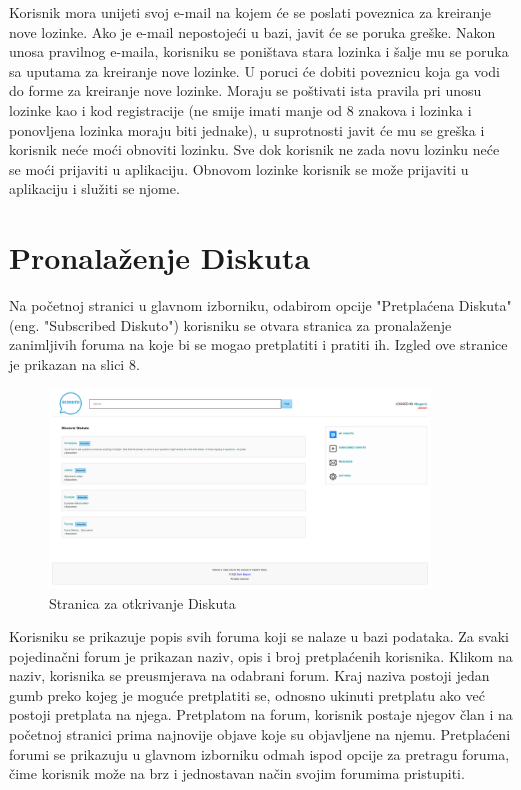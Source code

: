 \documentclass{foi}
\begin{document}
Korisnik mora unijeti svoj e-mail na kojem će se poslati poveznica za kreiranje nove lozinke. Ako je e-mail nepostojeći u bazi, javit će se poruka greške. Nakon unosa pravilnog e-maila, korisniku se poništava stara lozinka i šalje mu se poruka sa uputama za kreiranje nove lozinke. U poruci će dobiti poveznicu koja ga vodi do forme za kreiranje nove lozinke. Moraju se poštivati ista pravila pri unosu lozinke kao i kod registracije (ne smije imati manje od 8 znakova i lozinka i ponovljena lozinka moraju biti jednake), u suprotnosti javit će mu se greška i korisnik neće moći obnoviti lozinku. Sve dok korisnik ne zada novu lozinku neće se moći prijaviti u aplikaciju. Obnovom lozinke korisnik se može prijaviti u aplikaciju i služiti se njome.

\section{Pronalaženje Diskuta}

Na početnoj stranici u glavnom izborniku, odabirom opcije "Pretplaćena Diskuta" (eng. "Subscribed Diskuto") korisniku se otvara stranica za pronalaženje zanimljivih foruma na koje bi se mogao pretplatiti i pratiti ih. Izgled ove stranice je prikazan na slici 8.

\begin{figure}[h!]
    \centering
    \includegraphics[width=0.9\textwidth]{slike/otkrij.png}
    \caption{Stranica za otkrivanje Diskuta}
\end{figure}

Korisniku se prikazuje popis svih foruma koji se nalaze u bazi podataka.  Za svaki pojedinačni forum je prikazan naziv, opis i broj pretplaćenih korisnika. Klikom na naziv, korisnika se preusmjerava na odabrani forum. Kraj naziva postoji jedan gumb preko kojeg je moguće pretplatiti se, odnosno ukinuti pretplatu ako već postoji pretplata na njega. Pretplatom na forum, korisnik postaje njegov član i na početnoj stranici prima najnovije objave koje su objavljene na njemu. Pretplaćeni forumi se prikazuju u glavnom izborniku odmah ispod opcije za pretragu foruma, čime korisnik može na brz i jednostavan način svojim forumima pristupiti.
\end{document}
